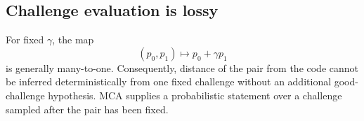 \subsection{Challenge evaluation is lossy}

For fixed \(\gamma\), the map
\[
  (p_0,p_1)\longmapsto p_0+\gamma p_1
\]
is generally many-to-one. Consequently, distance of the pair from the code
cannot be inferred
deterministically from one fixed challenge without an additional good-challenge
hypothesis.  MCA supplies a probabilistic statement over a challenge sampled
after the pair has been fixed.
